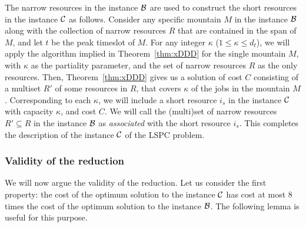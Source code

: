 \documentclass[11pt]{article}
\newcommand{\lspc}{{\sc LSPC}}
\newcommand{\cC}{{\cal C}}
\newcommand{\cB} {{\cal B}}
\begin{document}
The narrow resources in the instance $\cB$ are used to construct the short resources in the instance $\cC$ 
as follows.
Consider any specific mountain $M$ in the instance $\cB$ along with the collection of narrow resources $R$ that are 
contained in the span of $M$, and let $t$ be the peak timeslot of $M$. For any integer $\kappa$ ($1 \leq \kappa \leq d_t$), 
we will apply the algorithm implied in Theorem~\ref{thm:xDDD} for the single mountain $M$, with $\kappa$ as the 
partiality parameter, and the set of narrow resources $R$ as the only resources. 
Then, Theorem~\ref{thm:xDDD} gives us a solution of cost $C$ consisting of a multiset $R'$ of some resources in $R$, 
that covers $\kappa$ of the jobs in the mountain $M$. Corresponding to each $\kappa$, we will include a short 
resource $i_s$ in the instance $\cC$ with capacity $\kappa$, and cost $C$.  
We will call the (multi)set of narrow resources $R' \subseteq R$ in the instance $\cB$ 
as {\em associated} with the short resource $i_s$.  This completes the description of the instance $\cC$ 
of the {\lspc} problem.

\subsubsection*{Validity of the reduction}
We will now argue the validity of the reduction. 
Let us consider the first property:
the cost of the optimum solution to the instance $\cC$ has cost at most $8$ times
the cost of the optimum solution to the instance $\cB$.
The following lemma is useful for this purpose.
\end{document}
